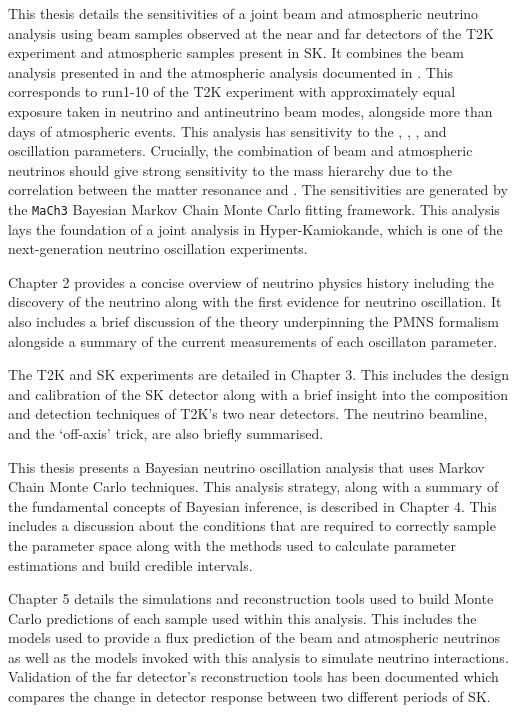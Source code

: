 This thesis details the sensitivities of a joint beam and atmospheric neutrino analysis using beam samples observed at the near and far detectors of the T2K experiment and atmospheric samples present in SK. It combines the beam analysis presented in \cite{Dunne2020-uf} and the atmospheric analysis documented in \cite{Jiang2019-iw}. This corresponds to run1-10 of the T2K experiment with approximately equal exposure taken in neutrino and antineutrino beam modes, alongside more than  days of atmospheric events. This analysis has sensitivity to the , , , and  oscillation parameters. Crucially, the combination of beam and atmospheric neutrinos should give strong sensitivity to the mass hierarchy due to the correlation between the matter resonance and . The sensitivities are generated by the \texttt{MaCh3} Bayesian Markov Chain Monte Carlo fitting framework. This analysis lays the foundation of a joint analysis in Hyper-Kamiokande, which is one of the next-generation neutrino oscillation experiments.

Chapter 2 provides a concise overview of neutrino physics history including the discovery of the neutrino along with the first evidence for neutrino oscillation. It also includes a brief discussion of the theory underpinning the PMNS formalism alongside a summary of the current measurements of each oscillaton parameter.

The T2K and SK experiments are detailed in Chapter 3. This includes the design and calibration of the SK detector along with a brief insight into the composition and detection techniques of T2K's two near detectors. The neutrino beamline, and the `off-axis' trick, are also briefly summarised. 

This thesis presents a Bayesian neutrino oscillation analysis that uses Markov Chain Monte Carlo techniques. This analysis strategy, along with a summary of the fundamental concepts of Bayesian inference, is described in Chapter 4. This includes a discussion about the conditions that are required to correctly sample the parameter space along with the methods used to calculate parameter estimations and build credible intervals.

Chapter 5 details the simulations and reconstruction tools used to build Monte Carlo predictions of each sample used within this analysis. This includes the models used to provide a flux prediction of the beam and atmospheric neutrinos as well as the models invoked with this analysis to simulate neutrino interactions. Validation of the far detector's reconstruction tools has been documented which compares the change in detector response between two different periods of SK.

